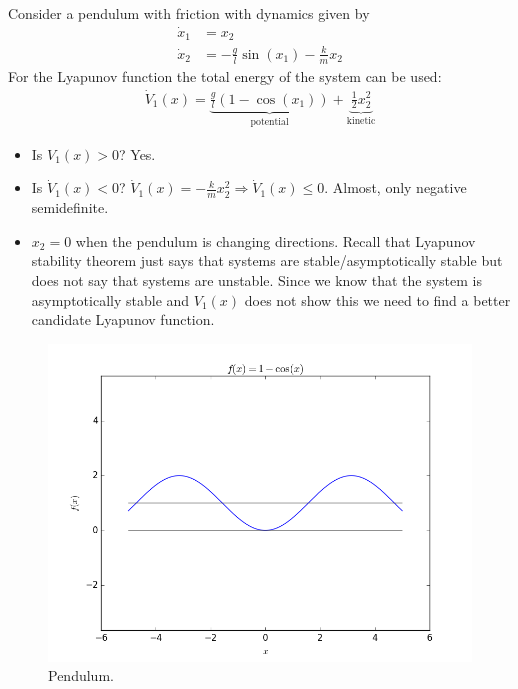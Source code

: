 \begin{example}
Consider a pendulum with friction with dynamics given by
\begin{align*}
\dot{x}_1 &= x_2 \\
\dot{x}_2 &= -\tfrac{g}{l}\sin(x_1) - \tfrac{k}{m}x_2
\end{align*}
For the Lyapunov function the total energy of the system can be used:
\begin{align*}
\dot{V}_1(x) = \underbrace{\tfrac{g}{l}(1-\cos(x_1))}_{\text{potential}} + \underbrace{\tfrac{1}{2}x_2^2}_{\text{kinetic}}
\end{align*}
\begin{itemize}
\item Is $V_1(x)>0$? Yes.
\item Is $\dot{V}_1(x)<0$? $\dot{V}_1(x) = -\tfrac{k}{m}x_2^2 \Rightarrow \dot{V}_1(x)\leq0$.
      Almost, only negative semidefinite.
\item $x_2=0$ when the pendulum is changing directions.
      Recall that Lyapunov stability theorem just says that systems are stable/asymptotically stable but does not say that systems are unstable.
      Since we know that the system is asymptotically stable and $V_1(x)$ does not show this we need to find a better candidate Lyapunov function.
\end{itemize}

\begin{figure}[ht!]
\centering
\includegraphics[width=.5\textwidth]{images/plot1minusCosX}
\caption{Pendulum.}
\label{fig:plot1minusCosX}
\end{figure}


\end{example}
